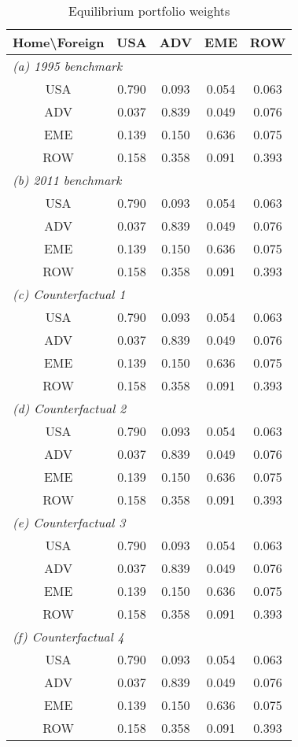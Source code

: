 \begin{table}[p]
\begin{center}
\caption{Equilibrium portfolio weights}
\label{tab:results-weights}
\small
\begin{tabular}{ccccc}
\toprule
Home\textbackslash Foreign&USA&ADV&EME&ROW\\
\midrule
\multicolumn{5}{l}{\textit{(a) 1995 benchmark}}\\
USA&0.790&0.093&0.054&0.063\\
ADV&0.037&0.839&0.049&0.076\\
EME&0.139&0.150&0.636&0.075\\
ROW&0.158&0.358&0.091&0.393\\
\midrule
\multicolumn{5}{l}{\textit{(b) 2011 benchmark}}\\
USA&0.790&0.093&0.054&0.063\\
ADV&0.037&0.839&0.049&0.076\\
EME&0.139&0.150&0.636&0.075\\
ROW&0.158&0.358&0.091&0.393\\
\midrule
\multicolumn{5}{l}{\textit{(c) Counterfactual 1}}\\
USA&0.790&0.093&0.054&0.063\\
ADV&0.037&0.839&0.049&0.076\\
EME&0.139&0.150&0.636&0.075\\
ROW&0.158&0.358&0.091&0.393\\
\midrule
\multicolumn{5}{l}{\textit{(d) Counterfactual 2}}\\
USA&0.790&0.093&0.054&0.063\\
ADV&0.037&0.839&0.049&0.076\\
EME&0.139&0.150&0.636&0.075\\
ROW&0.158&0.358&0.091&0.393\\
\midrule
\multicolumn{5}{l}{\textit{(e) Counterfactual 3}}\\
USA&0.790&0.093&0.054&0.063\\
ADV&0.037&0.839&0.049&0.076\\
EME&0.139&0.150&0.636&0.075\\
ROW&0.158&0.358&0.091&0.393\\
\midrule
\multicolumn{5}{l}{\textit{(f) Counterfactual 4}}\\
USA&0.790&0.093&0.054&0.063\\
ADV&0.037&0.839&0.049&0.076\\
EME&0.139&0.150&0.636&0.075\\
ROW&0.158&0.358&0.091&0.393\\
\bottomrule
\end{tabular}
\normalsize
\end{center}
\end{table}
